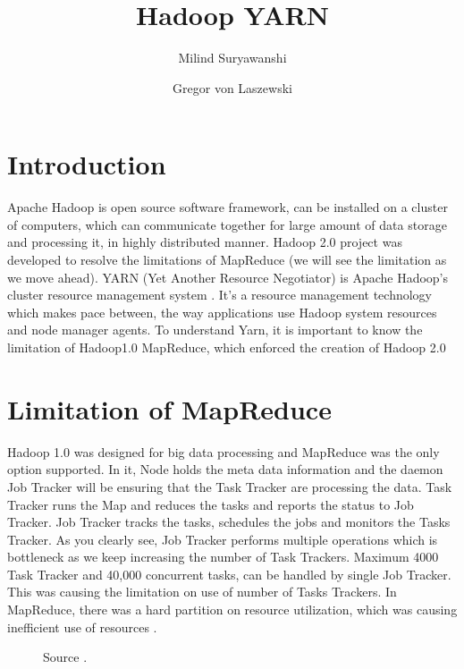 \documentclass[9pt,twocolumn,twoside]{../../styles/osajnl}
\title{Hadoop YARN}
\author[1,2]{Milind Suryawanshi}
\author[1,*]{Gregor von Laszewski}
\affil[1]{School of Informatics and Computing, Bloomington, IN 47408, U.S.A.}
\affil[2]{Savitribai Phule Pune University 2010, Pune, Maharashtra 411007 India }
\affil[*]{Corresponding authors: laszewski@gmail.com}
\begin{document}
\maketitle

\section{Introduction}

Apache Hadoop is open source software framework, can be installed on a cluster of computers, which can communicate together for large amount of data storage and processing it, in highly distributed manner. Hadoop 2.0 project was developed to resolve the limitations of MapReduce (we will see the limitation as we move ahead). YARN (Yet Another Resource Negotiator) is Apache Hadoop’s cluster resource management system \cite{www-1}. It’s a resource management technology which makes pace between, the way applications use Hadoop system resources and node manager agents.  To understand Yarn, it is important to know the limitation of Hadoop1.0 MapReduce, which enforced the creation of Hadoop 2.0 


\section{Limitation of MapReduce}

Hadoop 1.0 was designed for big data processing and MapReduce was the only option supported. In it, Node holds the meta data information and the daemon Job Tracker will be ensuring that the Task Tracker are processing the data. Task Tracker runs the Map and reduces the tasks and reports the status to Job Tracker. Job Tracker tracks the tasks, schedules the jobs and monitors the Tasks Tracker. As you clearly see, Job Tracker performs multiple operations which is bottleneck as we keep increasing the number of Task Trackers. Maximum 4000 Task Tracker and 40,000 concurrent tasks, can be handled by single Job Tracker. This was causing the limitation on use of number of Tasks Trackers. In MapReduce, there was a hard partition on resource utilization, which was causing inefficient use of resources \cite{www-5}.

\begin{figure}[htbp]
	\centering
	\caption{Source \cite{www-5}. }
	\label{fig:false-color}
\end{figure}
\end{document}
